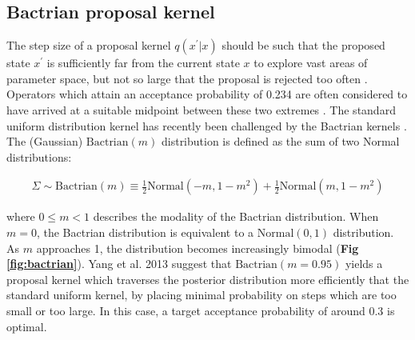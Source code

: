 \documentclass[10pt,letterpaper]{article}
\begin{document}
\clearpage
\subsection*{Bactrian proposal kernel} \label{sect:randomwalks}



The step size of a proposal kernel $q(x^\prime|x)$ should be such that the proposed state $x^\prime$ is sufficiently far from the current state $x$ to explore vast areas of parameter space, but not so large that the proposal is rejected too often \cite{roberts1997weak}. 
Operators which attain an acceptance probability of 0.234 are often considered to have arrived at a suitable midpoint between these two extremes \cite{bouckaert2019beast, roberts1997weak}.
The standard uniform distribution kernel has recently been challenged by the Bactrian kernels \cite{yang2013searching, thawornwattana2018designing}.
The (Gaussian) $\text{Bactrian}(m)$ distribution is defined as the sum of two Normal distributions:


\begin{align}
	\Sigma \sim \text{Bactrian}(m) \equiv \frac{1}{2}\text{Normal}(-m, 1-m^2) + \frac{1}{2}\text{Normal}(m, 1-m^2)
\end{align}


where $0 \leq m < 1$ describes the modality of the Bactrian distribution. When $m=0$, the Bactrian distribution is equivalent to a $\text{Normal}(0, 1)$ distribution. 
As $m$ approaches 1, the distribution becomes increasingly bimodal (\textbf{Fig \ref{fig:bactrian}}). 
Yang et al. 2013 \cite{yang2013searching} suggest that $\text{Bactrian}(m=0.95)$ yields a proposal kernel which traverses the posterior distribution more efficiently that the standard uniform kernel, by placing minimal probability on steps which are too small or too large.
In this case, a target acceptance probability of around 0.3 is optimal.
\end{document}
